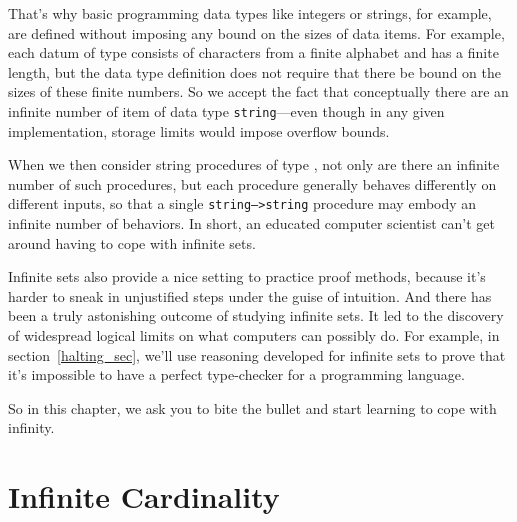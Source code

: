 \begin{editingnotes}
That's why basic programming data types like integers or
strings, for example, are defined without imposing any bound on the
sizes of data items.  For example, each datum of type
 consists of characters from a finite alphabet
and has a finite length, but the data type definition does not require
that there be bound on the sizes of these finite numbers.  So we
accept the fact that conceptually there are an infinite number of item
of data type \texttt{string}---even though in any given
implementation, storage limits would impose overflow bounds.

When we then consider string procedures of type
, not only are there an infinite number
of such procedures, but each procedure generally behaves differently
on different inputs, so that a single \texttt{string-->string}
procedure may embody an infinite number of behaviors.  In short, an
educated computer scientist can't get around having to cope with
infinite sets.
\end{editingnotes}

Infinite sets also provide a nice setting to practice proof methods,
because it's harder to sneak in unjustified steps under the guise of
intuition.  And there has been a truly astonishing outcome of studying
infinite sets.  It led to the discovery of widespread logical limits
on what computers can possibly do.  For example, in
section~\ref{halting_sec}, we'll use reasoning developed for infinite
sets to prove that it's impossible to have a perfect type-checker for
a programming language.

So in this chapter, we ask you to bite the bullet and start learning to
cope with infinity.

\iffalse 
But as a warmup, we'll first examine some basic properties of
\emph{finite} sets.
\fi

\section{Infinite Cardinality}\label{infinite_sec}

